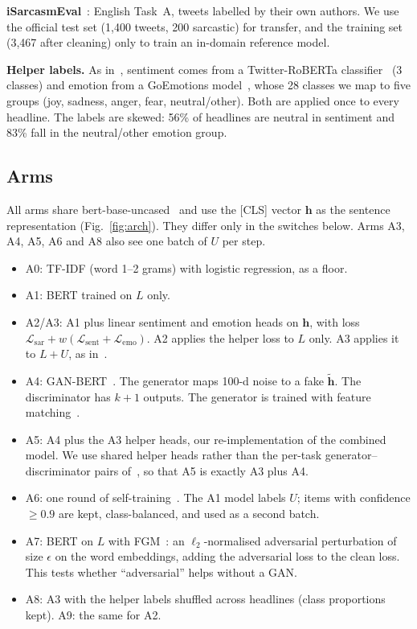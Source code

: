 \documentclass[conference]{IEEEtran}
\newcommand{\A}[1]{\textsf{#1}}    %
\begin{document}
\textbf{iSarcasmEval}~\cite{abufarha2022semeval}: English Task~A, tweets labelled by their own authors. We use the official test set (1,400 tweets, 200 sarcastic) for transfer, and the training set (3,467 after cleaning) only to train an in-domain reference model.

\textbf{Helper labels.} As in~\cite{irfan2025seed}, sentiment comes from a Twitter-RoBERTa classifier~\cite{barbieri2020tweeteval} (3 classes) and emotion from a GoEmotions model~\cite{demszky2020goemotions}, whose 28 classes we map to five groups (joy, sadness, anger, fear, neutral/other). Both are applied once to every headline. The labels are skewed: 56\% of headlines are neutral in sentiment and 83\% fall in the neutral/other emotion group.

\subsection{Arms}
All arms share bert-base-uncased~\cite{devlin2019bert} and use the [CLS] vector $\mathbf{h}$ as the sentence representation (Fig.~\ref{fig:arch}). They differ only in the switches below. Arms A3, A4, A5, A6 and A8 also see one batch of $U$ per step.
\begin{itemize}
\item \A{A0}: TF-IDF (word 1--2 grams) with logistic regression, as a floor.
\item \A{A1}: BERT trained on $L$ only.
\item \A{A2}/\A{A3}: A1 plus linear sentiment and emotion heads on $\mathbf{h}$, with loss $\mathcal{L}_{\mathrm{sar}} + w(\mathcal{L}_{\mathrm{sent}} + \mathcal{L}_{\mathrm{emo}})$. A2 applies the helper loss to $L$ only. A3 applies it to $L{+}U$, as in~\cite{irfan2025seed}.
\item \A{A4}: GAN-BERT~\cite{croce2020ganbert}. The generator maps 100-d noise to a fake $\tilde{\mathbf{h}}$. The discriminator has $k{+}1$ outputs. The generator is trained with feature matching~\cite{salimans2016improved}.
\item \A{A5}: A4 plus the A3 helper heads, our re-implementation of the combined model. We use shared helper heads rather than the per-task generator--discriminator pairs of~\cite{irfan2025seed}, so that A5 is exactly A3 plus A4.
\item \A{A6}: one round of self-training~\cite{lee2013pseudo}. The A1 model labels $U$; items with confidence $\geq 0.9$ are kept, class-balanced, and used as a second batch.
\item \A{A7}: BERT on $L$ with FGM~\cite{goodfellow2015explaining,miyato2017adversarial}: an $\ell_2$-normalised adversarial perturbation of size $\epsilon$ on the word embeddings, adding the adversarial loss to the clean loss. This tests whether ``adversarial'' helps without a GAN.
\item \A{A8}: A3 with the helper labels shuffled across headlines (class proportions kept). \A{A9}: the same for A2.
\end{itemize}
\end{document}

